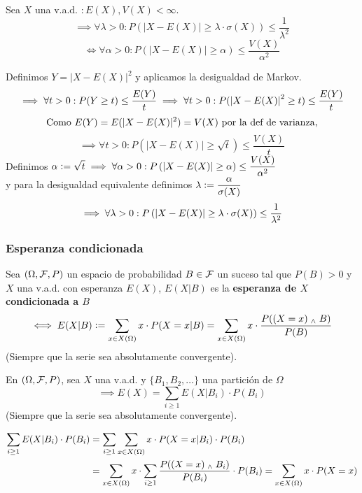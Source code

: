 \begin{teo}
	Sea $X$ una v.a.d. $: E(X), V(X)< \infty$.
	\[\implies \forall \lambda>0 : P(|X-E(X)|\geq \lambda\cdot \sigma(X)) \leq \frac{1}{\lambda^2}\]
	\[\iff \forall \alpha > 0 : \boxed{P\left(|X-E(X)|\geq \alpha\right) \leq \frac{V(X)}{\alpha^2}}\]
	\begin{dem}
		Definimos $Y=|X-E(X)|^2$ y aplicamos la desigualdad de Markov.
		\[\implies \forall t > 0 : P(Y\geq t) \leq \frac{E(Y)}{t} \implies \forall t>0: P(\left|X-E(X)\right|^2\geq t)\leq \frac{E(Y)}{t}\]
		\[\text{Como } E(Y) = E(|X-E(X)|^2) = V(X) \text{ por la def de varianza,}\]
		\[\implies \forall t>0: P\left(|X-E(X)|\geq \sqrt{t}\right)\leq \frac{V(X)}{t}\]
		Definimos $\displaystyle \alpha\vcentcolon= \sqrt{t} \implies \forall \alpha>0: P\left(|X-E(X)|\geq \alpha\right)\leq \frac{V(X)}{\alpha^2}$\\
		y para la desigualdad equivalente definimos $\displaystyle \lambda \vcentcolon= \frac{\alpha}{\sigma(X)}$
		\[\implies \forall \lambda>0 : P\left(\left|X-E(X)\right|\geq \lambda\cdot \sigma(X)\right) \leq \frac{1}{\lambda^2}\]
	\end{dem}
\end{teo}

\subsubsection{Esperanza condicionada}

\begin{defn}
	Sea $(\Omega, \mathcal{F}, P)$ un espacio de probabilidad $B\in \mathcal{F}$ un suceso tal que $P(B)>0$ y  $X$ una v.a.d. con esperanza $E(X)$, $E(X|B)$ es la \textbf{esperanza de $X$ condicionada a $B$}
	\[\iff E(X|B) \vcentcolon= \sum_{x\in X(\Omega)} x \cdot P(X=x | B) = \sum_{x\in X(\Omega)} x \cdot \frac{P((X=x)\; _{\wedge} \; B)}{P(B)}\]
	(Siempre que la serie sea absolutamente convergente).
\end{defn}

\begin{teo}
	En $(\Omega, \mathcal{F}, P)$, sea $X$ una v.a.d. y $\{B_1, B_2, \dots\}$ una partición de $\Omega$
	\[\implies E(X)=\sum_{i\geq 1} E(X|B_i)\cdot P(B_i)\]
	(Siempre que la serie sea absolutamente convergente).
	\begin{dem}
		\[\begin{aligned}
				\sum_{i\geq 1} E(X|B_i)\cdot P(B_i) & =\sum_{i\geq 1}\sum_{x\in X(\Omega)} x\cdot P(X=x|B_i)\cdot P(B_i)                                                           \\
				                                    & =\sum_{x\in X(\Omega)} x\cdot \sum_{i\geq 1}\frac{P((X=x)\; _{\wedge} \; B_i)}{P(B_i)}\cdot P(B_i) = \sum_{x\in X(\Omega)} x\cdot P(X=x)
			\end{aligned}\]
	\end{dem}
\end{teo}

